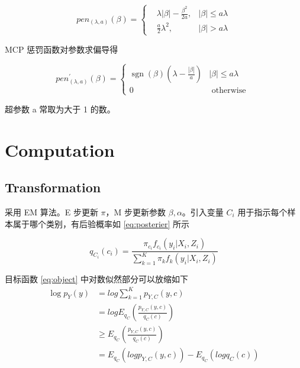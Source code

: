 \documentclass[12pt, a4paper, oneside]{article}
\numberwithin{equation}{section}
\begin{document}
\begin{equation}
	\label{eq:mcp}
	pen_{(\lambda, a)}(\beta) = \left\{
	\begin{aligned}
		&\lambda |\beta| - \frac{\beta^2}{2a}, & |\beta| \leq a\lambda \\
		&\frac{a}{2}\lambda^2, & |\beta| > a\lambda
	\end{aligned}
	\right.
\end{equation}

MCP 惩罚函数对参数求偏导得

\begin{equation}
	pen_{(\lambda, a)}^{\prime}(\beta)= \begin{cases}\operatorname{sgn}(\beta)\left(\lambda-\frac{|\beta|}{a}\right) & |\beta| \leq a \lambda \\ 0 & \text { otherwise }\end{cases}
\end{equation}

超参数 a 常取为大于 1 的数。

\section{Computation}

\subsection{Transformation}

采用 EM 算法。E 步更新 $\pi$，M 步更新参数 $\beta, \alpha$。引入变量 $C_i$ 用于指示每个样本属于哪个类别，有后验概率如 \ref{eq:posterier} 所示

\begin{equation}
	q_{C_i}(c_i) = \frac{{\pi_{c_i} f_{c_i}(y_i|X_i,Z_i)}}{\displaystyle\sum_{k=1}^{K}\pi_{k} f_{k}(y_i|X_i,Z_i)}
	\label{eq:posterier}
\end{equation}

目标函数 \ref{eq:object} 中对数似然部分可以放缩如下
\begin{equation}
	\begin{aligned}
		\log p_Y (y)  &= log \sum_{k = 1}^{K}p_{Y,C}(y,c) \\
		&= log E_{q_C}\left(\frac{p_{Y,C}(y,c)}{q_C(c)}\right) \\
		&\geq E_{q_C}\left(\frac{p_{Y,C}(y,c)}{q_C(c)}\right) \\
		&= E_{q_C} \left(log p_{Y,C}(y,c)\right) - E_{q_C}\left(log q_C(c)\right)
	\end{aligned} 
\label{eq:logtrans}
\end{equation}
\end{document}
